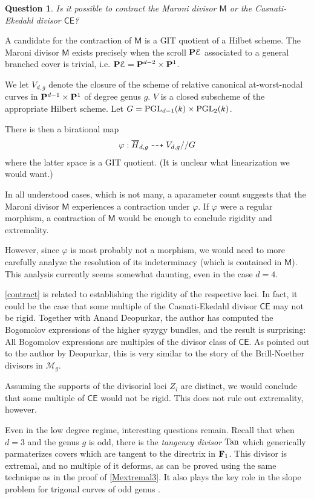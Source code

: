 \documentclass[reqno, 10 pt]{article}
\newtheorem{question}[thm]{Question}
\theoremstyle{definition}
\theoremstyle{remark}
\numberwithin{equation}{section}
\numberwithin{thm}{section}
\numberwithin{prop}{section}
\numberwithin{lem}{section}
\numberwithin{cor}{section}
\numberwithin{conj}{section}
\numberwithin{defn}{section}
\newcommand{\M}{\mathcal M}
\newcommand{\F}{{\mathbf F}}
\newcommand{\sfCE}{{\mathsf {CE}}}
\newcommand{\sfM}{{\mathsf M}}
\newcommand{\cE}{{\mathcal E}}
\renewcommand{\P}{{\bf P}}
\renewcommand{\F}{{\bf F}}
\newcommand {\PGL}{{\rm PGL}}
\begin{document}
\begin{question}\label{contract}
Is it possible to contract the Maroni divisor $\sfM$ or the Casnati-Ekedahl divisor $\sfCE$?
\end{question}

A candidate for the contraction of $\sfM$ is a GIT quotient of a Hilbet scheme. The Maroni divisor $\sfM$ exists precisely when the scroll $\P \cE$ associated to a general branched cover is trivial, i.e. $\P \cE = \P^{d-2} \times \P^{1}$. 

We let $V_{d,g}$ denote the closure of the scheme of relative canonical at-worst-nodal curves in $\P^{d-1}\times \P^{1}$ of degree genus $g$. $V$ is a closed subscheme of the appropriate Hilbert scheme. Let $G = \PGL_{d-1}(k) \times \PGL_{2}(k)$.

There is then a birational map $$\varphi : \overline{H}_{d,g} \dashrightarrow V_{d,g}//G$$
where the latter space is a GIT quotient. (It is unclear what linearization we would want.)

In all understood cases, which is not many, a aparameter count suggests that the Maroni divisor $\sfM$ experiences a contraction under $\varphi$. If $\varphi$ were a regular morphism, a contraction of $\sfM$ would be enough to conclude rigidity and extremality. 

However, since $\varphi$ is most probably not a morphism, we would need to more carefully analyze the resolution of its indeterminacy (which is contained in $\sfM$).  This analysis currently seems somewhat daunting, even in the case $d=4$.


\autoref{contract} is related to establishing the rigidity of the respective loci.  In fact, it could be the case that some multiple of the Casnati-Ekedahl divisor $\sfCE$ may not be rigid.  Together with Anand Deopurkar, the author has computed the Bogomolov expressions of the higher syzygy bundles, and the result is surprising:  All Bogomolov expressions are multiples of the divisor class of $\sfCE$.  As pointed out to the author by Deopurkar, this is very similar to the story of the Brill-Noether divisors in $\M_{g}$.  

Assuming the supports of the divisorial loci $Z_{i}$ are distinct, we would conclude that some multiple of $\sfCE$ would not be rigid.  This does not rule out extremality, however.


Even in the low degree regime, interesting questions remain. Recall that when $d=3$ and the genus $g$ is odd, there is the {\sl tangency divisor} ${\rm Tan}$ which generically parmaterizes covers which are tangent to the directrix in $\F_{1}$.  This divisor is extremal, and no multiple of it deforms, as can be proved using the same technique as in the proof of \autoref{Mextremal3}. It also plays the key role in the slope problem for trigonal curves of odd genus \cite{deopurkar_patel:sharp_trigonal}.
\end{document}
